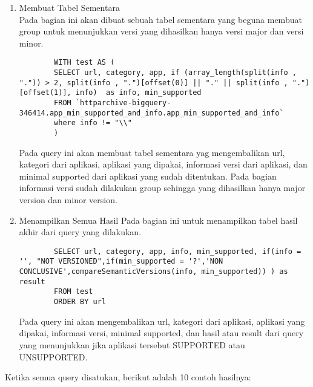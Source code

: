 \begin{enumerate}
	\item Membuat Tabel Sementara\\
	Pada bagian ini akan dibuat sebuah tabel sementara yang beguna membuat group untuk menunjukkan versi yang dihasilkan hanya versi major dan versi minor.
	\begin{lstlisting}
		WITH test AS (
		SELECT url, category, app, if (array_length(split(info , ".")) > 2, split(info , ".")[offset(0)] || "." || split(info , ".")[offset(1)], info)  as info, min_supported	
		FROM `httparchive-bigquery-346414.app_min_supported_and_info.app_min_supported_and_info`
		where info != "\\"
		)
	\end{lstlisting}
	Pada query ini akan membuat tabel sementara yag mengembalikan url, kategori dari aplikasi, aplikasi yang dipakai, informasi versi dari aplikasi, dan minimal supported dari aplikasi yang sudah ditentukan. Pada bagian informasi versi sudah dilakukan group sehingga yang dihasilkan hanya major version dan minor version. 
	
	
	\item Menampilkan Semua Hasil
	Pada bagian ini untuk menampilkan tabel hasil akhir dari query yang dilakukan.
	\begin{lstlisting}
		SELECT url, category, app, info, min_supported, if(info = '', "NOT VERSIONED",if(min_supported = '?','NON CONCLUSIVE',compareSemanticVersions(info, min_supported)) ) as  result
		FROM test 
		ORDER BY url
	\end{lstlisting}
Pada query ini akan mengembalikan url, kategori dari aplikasi, aplikasi yang dipakai, informasi versi, minimal supported, dan hasil atau result dari query yang menunjukkan jika aplikasi tersebut SUPPORTED atau UNSUPPORTED.
\end{enumerate}
Ketika semua query disatukan, berikut adalah 10 contoh hasilnya:

